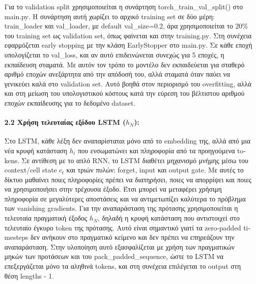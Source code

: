 \documentclass[11pt,a4paper]{article}
\begin{document}
Για το \textlatin{validation split} χρησιμοποιείται η συνάρτηση \textlatin{torch\_train\_val\_split()} στο \textlatin{main.py}. 
Η συνάρτηση αυτή χωρίζει το αρχικό \textlatin{training set} σε δύο μέρη: \textlatin{train\_loader} και \textlatin{val\_loader}, 
με \textlatin{default} \textlatin{val\_size=0.2}, άρα χρησιμοποιείται το 20\% του \textlatin{training set} ως \textlatin{validation set}, 
όπως φαίνεται και στην \textlatin{training.py}.
Στη συνέχεια εφαρμόζεται \textlatin{early stopping} με την κλάση \textlatin{EarlyStopper} στο \textlatin{main.py}. Σε κάθε εποχή 
υπολογίζεται το \textlatin{val\_loss}, και αν αυτό επιδεινώνεται συνεχώς για 5 εποχές, η εκπαίδευση σταματά. 
Με αυτόν τον τρόπο το μοντέλο δεν εκπαιδεύεται για σταθερό αριθμό εποχών ανεξάρτητα από την απόδοσή του, αλλά σταματά όταν παύει να γενικεύει 
καλά στο \textlatin{validation set}. Αυτό βοηθά στον περιορισμό του \textlatin{overfitting}, αλλά και στη μείωση του υπολογιστικού κόστους 
κατά την εύρεση του βέλτιστου αριθμού εποχών εκπαίδευσης για το δεδομένο \textlatin{dataset}.

\paragraph{2.2 Χρήση τελευταίας εξόδου \textlatin{LSTM} ($h_N$):}

Στο \textlatin{LSTM}, κάθε λέξη δεν αναπαρίσταται μόνο από το \textlatin{embedding} της, αλλά από μια νέα κρυφή κατάσταση $h_i$ που ενσωματώνει και 
πληροφορία από τα προηγούμενα \textlatin{tokens}. Σε αντίθεση με το απλό \textlatin{RNN}, το \textlatin{LSTM} διαθέτει μηχανισμό μνήμης μέσω 
του \textlatin{context/cell state} $c_t$ και τριών πυλών: \textlatin{forget}, \textlatin{input} και \textlatin{output gate}. Με αυτές το δίκτυο 
μαθαίνει ποιες πληροφορίες πρέπει να διατηρήσει, ποιες να απορρίψει και ποιες να χρησιμοποιήσει στην τρέχουσα έξοδο. Έτσι μπορεί να μεταφέρει 
χρήσιμη πληροφορία σε μεγαλύτερες αποστάσεις και να αντιμετωπίζει καλύτερα το πρόβλημα των \textlatin{vanishing gradients}.
Για την αναπαράσταση της πρότασης χρησιμοποιείται η τελευταία πραγματική έξοδος $h_N$, δηλαδή η κρυφή κατάσταση που αντιστοιχεί στο 
τελευταίο έγκυρο \textlatin{token} της πρότασης. Αυτό είναι σημαντικό γιατί τα \textlatin{zero-padded timesteps} δεν ανήκουν στο πραγματικό 
κείμενο και δεν πρέπει να επηρεάζουν την αναπαράσταση. Στην υλοποίηση αυτό εξασφαλίζεται με χρήση των πραγματικών μηκών των προτάσεων και 
του \textlatin{pack\_padded\_sequence}, ώστε το \textlatin{LSTM} να επεξεργάζεται μόνο τα αληθινά \textlatin{tokens}, και στη συνέχεια 
επιλέγεται το \textlatin{output} στη θέση \textlatin{lengths - 1}.
\end{document}
